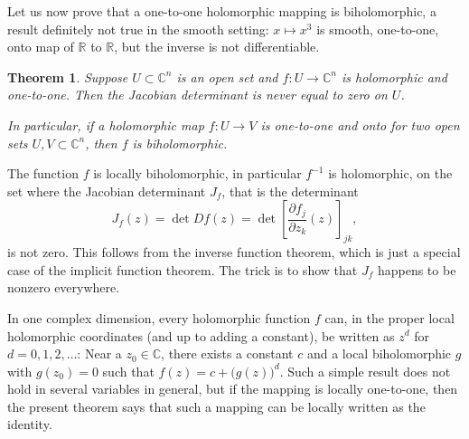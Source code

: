 \documentclass[12pt,openany]{book}
\newcommand{\C}{{\mathbb{C}}}
\newcommand{\R}{{\mathbb{R}}}
\theoremstyle{plain}
\newtheorem{thm}{Theorem}[section]
\theoremstyle{remark}
\theoremstyle{definition}
\theoremstyle{exercise}
\theoremstyle{example}
\begin{document}
Let us now prove that a one-to-one holomorphic
mapping is biholomorphic, a result definitely not true in the
smooth setting: $x \mapsto x^3$ is smooth, one-to-one, onto map
of $\R$ to $\R$, but the inverse is not differentiable.

\begin{thm} \label{thm:injective}
Suppose $U \subset \C^n$ is an open set and $f \colon U \to \C^n$ is
holomorphic and one-to-one.  Then the Jacobian determinant is never equal to zero 
on $U$.

In particular, if a holomorphic map $f \colon U \to V$ is
one-to-one and onto for two open sets $U,V \subset \C^n$, then $f$ is
biholomorphic.
\end{thm}

The function $f$ is locally biholomorphic, in particular
$f^{-1}$ is holomorphic,
on the set where the Jacobian determinant $J_f$, that is the determinant
\begin{equation*}
J_f(z) = \det Df(z) = \det \left[ \frac{\partial f_j}{\partial z_k}(z)
\right]_{jk} ,
\end{equation*}
is not zero.  This follows from the inverse function theorem, which is just
a special case of the implicit function theorem.
The trick is to show that $J_f$ happens to be nonzero
everywhere.

In one complex dimension, every holomorphic function $f$ can, in
the proper local holomorphic coordinates (and up to adding a constant),
be written as $z^d$ for $d=0,1,2,\ldots$:
Near a $z_0 \in \C$,
there exists a constant $c$ and a local biholomorphic $g$
with $g(z_0) = 0$ such that
$f(z) = c + {\bigl( g(z) \bigr)}^d$.
Such a simple result
does not hold in several variables in general, but if the mapping is
locally one-to-one, then the present theorem says that such a mapping can be
locally written as the identity.
\end{document}
